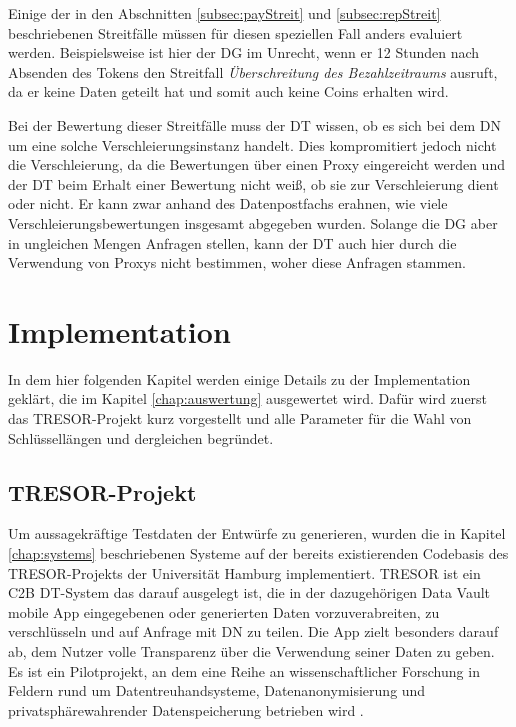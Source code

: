 \documentclass[
	fontsize=11pt,
	headings=small,
	parskip=half,           %
	bibliography=totoc,
	numbers=noenddot,       %
	open=any,               %
]{scrreprt}
\begin{document}
Einige der in den Abschnitten \ref{subsec:payStreit} und \ref{subsec:repStreit} beschriebenen Streitfälle müssen für diesen speziellen Fall anders evaluiert werden. Beispielsweise ist hier der DG im Unrecht, wenn er 12 Stunden nach Absenden des Tokens den Streitfall \textit{Überschreitung des Bezahlzeitraums} ausruft, da er keine Daten geteilt hat und somit auch keine Coins erhalten wird.

Bei der Bewertung dieser Streitfälle muss der DT wissen, ob es sich bei dem DN um eine solche Verschleierungsinstanz handelt. Dies kompromitiert jedoch nicht die Verschleierung, da die Bewertungen über einen Proxy eingereicht werden und der DT beim Erhalt einer Bewertung nicht weiß, ob sie zur Verschleierung dient oder nicht. Er kann zwar anhand des Datenpostfachs erahnen, wie viele Verschleierungsbewertungen insgesamt abgegeben wurden. Solange die DG aber in ungleichen Mengen Anfragen stellen, kann der DT auch hier durch die Verwendung von Proxys nicht bestimmen, woher diese Anfragen stammen.




\chapter{Implementation}
\label{chap:impl}
In dem hier folgenden Kapitel werden einige Details zu der Implementation geklärt, die im Kapitel \ref{chap:auswertung} ausgewertet wird. Dafür wird zuerst das TRESOR-Projekt kurz vorgestellt und alle Parameter für die Wahl von Schlüssellängen und dergleichen begründet.

\section{TRESOR-Projekt}
Um aussagekräftige Testdaten der Entwürfe zu generieren, wurden die in Kapitel \ref{chap:systems} beschriebenen Systeme auf der bereits existierenden Codebasis des TRESOR-Projekts der Universität Hamburg implementiert. TRESOR ist ein C2B DT-System das darauf ausgelegt ist, die in der dazugehörigen Data Vault mobile App eingegebenen oder generierten Daten vorzuverabreiten, zu verschlüsseln und auf Anfrage mit DN zu teilen. Die App zielt besonders darauf ab, dem Nutzer volle Transparenz über die Verwendung seiner Daten zu geben. Es ist ein Pilotprojekt, an dem eine Reihe an wissenschaftlicher Forschung in Feldern rund um Datentreuhandsysteme, Datenanonymisierung und privatsphärewahrender Datenspeicherung betrieben wird \cite{TRESOR}.
\end{document}
